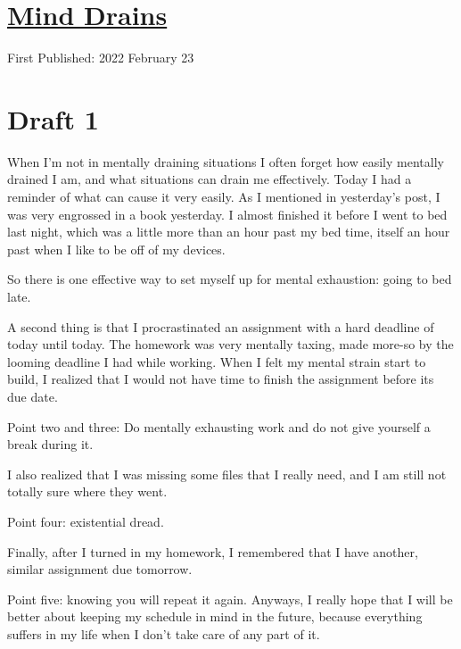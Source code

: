 \documentclass[12pt]{article}[titlepage]
\newcommand{\1}{\={a}}
\newcommand{\2}{\={e}}
\newcommand{\3}{\={\i}}
\newcommand{\4}{\=o}
\newcommand{\5}{\=u}
\newcommand{\6}{\={A}}
\renewcommand{\,}{\textsuperscript{,}}
\begin{document}
\doublespacing
\section{\href{mind-drains.html}{Mind Drains}}
First Published: 2022 February 23

\section{Draft 1}
When I'm not in mentally draining situations I often forget how easily mentally drained I am, and what situations can drain me effectively.
Today I had a reminder of what can cause it very easily.
As I mentioned in yesterday's post, I was very engrossed in a book yesterday.
I almost finished it before I went to bed last night, which was a little more than an hour past my bed time, itself an hour past when I like to be off of my devices.

So there is one effective way to set myself up for mental exhaustion: going to bed late.

A second thing is that I procrastinated an assignment with a hard deadline of today until today.
The homework was very mentally taxing, made more-so by the looming deadline I had while working.
When I felt my mental strain start to build, I realized that I would not have time to finish the assignment before its due date.

Point two and three: Do mentally exhausting work and do not give yourself a break during it.

I also realized that I was missing some files that I really need, and I am still not totally sure where they went.

Point four: existential dread.

Finally, after I turned in my homework, I remembered that I have another, similar assignment due tomorrow.

Point five: knowing you will repeat it again.
Anyways, I really hope that I will be better about keeping my schedule in mind in the future, because everything suffers in my life when I don't take care of any part of it.
\end{document}
